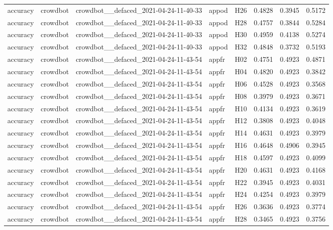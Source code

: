 \begin{table}[tbp]
\begin{tabular}{lllllrrr}
accuracy & crowdbot & crowdbot\_\_defaced\_2021-04-24-11-40-33 & appod & H26 & 0.4828 & 0.3945 & 0.5172 \\
accuracy & crowdbot & crowdbot\_\_defaced\_2021-04-24-11-40-33 & appod & H28 & 0.4757 & 0.3844 & 0.5284 \\
accuracy & crowdbot & crowdbot\_\_defaced\_2021-04-24-11-40-33 & appod & H30 & 0.4959 & 0.4138 & 0.5274 \\
accuracy & crowdbot & crowdbot\_\_defaced\_2021-04-24-11-40-33 & appod & H32 & 0.4848 & 0.3732 & 0.5193 \\
accuracy & crowdbot & crowdbot\_\_defaced\_2021-04-24-11-43-54 & appfr & H02 & 0.4751 & 0.4923 & 0.4871 \\
accuracy & crowdbot & crowdbot\_\_defaced\_2021-04-24-11-43-54 & appfr & H04 & 0.4820 & 0.4923 & 0.3842 \\
accuracy & crowdbot & crowdbot\_\_defaced\_2021-04-24-11-43-54 & appfr & H06 & 0.4528 & 0.4923 & 0.3568 \\
accuracy & crowdbot & crowdbot\_\_defaced\_2021-04-24-11-43-54 & appfr & H08 & 0.3979 & 0.4923 & 0.3671 \\
accuracy & crowdbot & crowdbot\_\_defaced\_2021-04-24-11-43-54 & appfr & H10 & 0.4134 & 0.4923 & 0.3619 \\
accuracy & crowdbot & crowdbot\_\_defaced\_2021-04-24-11-43-54 & appfr & H12 & 0.3808 & 0.4923 & 0.4048 \\
accuracy & crowdbot & crowdbot\_\_defaced\_2021-04-24-11-43-54 & appfr & H14 & 0.4631 & 0.4923 & 0.3979 \\
accuracy & crowdbot & crowdbot\_\_defaced\_2021-04-24-11-43-54 & appfr & H16 & 0.4648 & 0.4906 & 0.3945 \\
accuracy & crowdbot & crowdbot\_\_defaced\_2021-04-24-11-43-54 & appfr & H18 & 0.4597 & 0.4923 & 0.4099 \\
accuracy & crowdbot & crowdbot\_\_defaced\_2021-04-24-11-43-54 & appfr & H20 & 0.4631 & 0.4923 & 0.4168 \\
accuracy & crowdbot & crowdbot\_\_defaced\_2021-04-24-11-43-54 & appfr & H22 & 0.3945 & 0.4923 & 0.4031 \\
accuracy & crowdbot & crowdbot\_\_defaced\_2021-04-24-11-43-54 & appfr & H24 & 0.4254 & 0.4923 & 0.3979 \\
accuracy & crowdbot & crowdbot\_\_defaced\_2021-04-24-11-43-54 & appfr & H26 & 0.3636 & 0.4923 & 0.3774 \\
accuracy & crowdbot & crowdbot\_\_defaced\_2021-04-24-11-43-54 & appfr & H28 & 0.3465 & 0.4923 & 0.3756 \\

\end{tabular}
\end{table}
